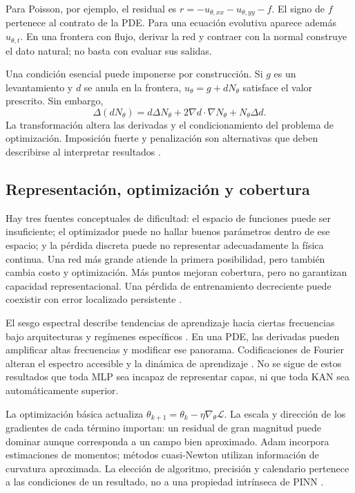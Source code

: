 Para Poisson, por ejemplo, el residual es $r=-u_{\theta,xx}-u_{\theta,yy}-f$. El signo de $f$ pertenece al contrato de la PDE. Para una ecuación evolutiva aparece además $u_{\theta,t}$. En una frontera con flujo, derivar la red y contraer con la normal construye el dato natural; no basta con evaluar sus salidas.

Una condición esencial puede imponerse por construcción. Si $g$ es un levantamiento y $d$ se anula en la frontera, $u_\theta=g+dN_\theta$ satisface el valor prescrito. Sin embargo,
\begin{equation}
\Delta(dN_\theta)=d\Delta N_\theta+2\nabla d\cdot\nabla N_\theta+N_\theta\Delta d.
\end{equation}
La transformación altera las derivadas y el condicionamiento del problema de optimización. Imposición fuerte y penalización son alternativas que deben describirse al interpretar resultados \cite{lu2021deepxde,wang2023expertguide}.

\subsection{Representación, optimización y cobertura}
Hay tres fuentes conceptuales de dificultad: el espacio de funciones puede ser insuficiente; el optimizador puede no hallar buenos parámetros dentro de ese espacio; y la pérdida discreta puede no representar adecuadamente la física continua. Una red más grande atiende la primera posibilidad, pero también cambia costo y optimización. Más puntos mejoran cobertura, pero no garantizan capacidad representacional. Una pérdida de entrenamiento decreciente puede coexistir con error localizado persistente \cite{krishnapriyan2021,deryckmishra2022}.

El sesgo espectral describe tendencias de aprendizaje hacia ciertas frecuencias bajo arquitecturas y regímenes específicos \cite{rahaman2019}. En una PDE, las derivadas pueden amplificar altas frecuencias y modificar ese panorama. Codificaciones de Fourier alteran el espectro accesible y la dinámica de aprendizaje \cite{tancik2020,wang2021eigenvector}. No se sigue de estos resultados que toda MLP sea incapaz de representar capas, ni que toda KAN sea automáticamente superior.

La optimización básica actualiza $\theta_{k+1}=\theta_k-\eta\nabla_\theta\mathcal L$. La escala y dirección de los gradientes de cada término importan: un residual de gran magnitud puede dominar aunque corresponda a un campo bien aproximado. Adam incorpora estimaciones de momentos; métodos cuasi-Newton utilizan información de curvatura aproximada. La elección de algoritmo, precisión y calendario pertenece a las condiciones de un resultado, no a una propiedad intrínseca de PINN \cite{wang2023expertguide}.

